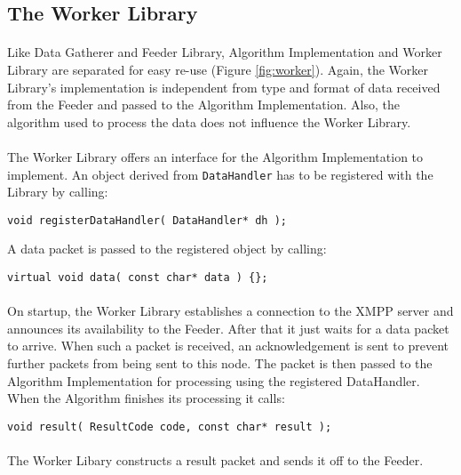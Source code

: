 \subsection{The Worker Library}
\label{sec:workerlib}
\paragraph{}
Like Data Gatherer and Feeder Library, Algorithm Implementation and Worker Library are separated for easy re-use (Figure \ref{fig:worker}). Again, the Worker Library's implementation is independent from type and format of data received from the Feeder and passed to the Algorithm Implementation. Also, the algorithm used to process the data does not influence the Worker Library.

\paragraph{}
The Worker Library offers an interface for the Algorithm Implementation to implement. An object derived from \texttt{DataHandler} has to be registered with the Library by calling:
\begin{flushleft}
\texttt{void registerDataHandler( DataHandler* dh );}
\end{flushleft}
A data packet is passed to the registered object by calling:
\begin{flushleft}
\texttt{virtual void data( const char* data ) \{\};}
\end{flushleft}

\paragraph{}
On startup, the Worker Library establishes a connection to the XMPP server and announces its availability to the Feeder. After that it just waits for a data packet to arrive. When such a packet is received, an acknowledgement is sent to prevent further packets from being sent to this node. The packet is then passed to the Algorithm Implementation for processing using the registered DataHandler. When the Algorithm finishes its processing it calls:
\begin{flushleft}
\texttt{void result( ResultCode code, const char* result );}
\end{flushleft}
\paragraph{}
The Worker Libary constructs a result packet and sends it off to the Feeder.

